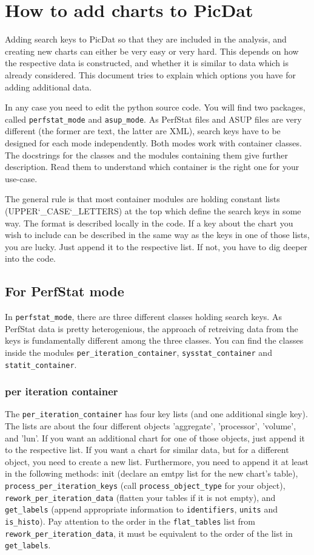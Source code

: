\documentclass[a4paper,11pt]{article}
\begin{document}
\section*{How to add charts to PicDat}

Adding search keys to PicDat so that they are included in the analysis, and creating new charts can either be very easy or very hard. This depends on how the respective data is constructed, and whether it is similar to data which is already considered. This document tries to explain which options you have for adding additional data.
\bigskip

In any case you need to edit the python source code. You will find two packages, called \verb|perfstat_mode| and \verb|asup_mode|. As PerfStat files and ASUP files are very different (the former are text, the latter are XML), search keys have to be designed for each mode independently. Both modes work with container classes. The docstrings for the classes and the modules containing them give further description. Read them to understand which container is the right one for your use-case.
\bigskip

The general rule is that most container modules are holding constant lists (UPPER\char`_CASE\char`_\break LETTERS) at the top which define the search keys in some way. The format is described locally in the code. If a key about the chart you wish to include can be described in the same way as the keys in one of those lists, you are lucky. Just append it to the respective list. If not, you have to dig deeper into the code.

\subsection*{For PerfStat mode}
In \verb|perfstat_mode|, there are three different classes holding search keys. As PerfStat data is pretty heterogenious, the approach of retreiving data from the keys is fundamentally different among the three classes. You can find the classes inside the modules \verb|per_iteration_container|, \verb|sysstat_container| and \verb|statit_container|.

\subsubsection*{per iteration container}
The \verb|per_iteration_container| has four key lists (and one additional single key). The lists are about the four different objects 'aggregate', 'processor', 'volume', and 'lun'. If you want an additional chart for one of those objects, just append it to the respective list. If you want a chart for similar data, but for a different object, you need to create a new list. Furthermore, you need to append it at least in the following methods: init (declare an emtpy list for the new chart's table), \verb|process_per_iteration_keys| (call \verb|process_object_type| for your object), \verb|rework_per_iteration_data| (flatten your tables if it is not empty), and \verb|get_labels| (append appropriate information to \verb|identifiers|, \verb|units| and \verb|is_histo|). Pay attention to the order in the \verb|flat_tables| list from \verb|rework_per_iteration_data|, it must be equivalent to the order of the list in \verb|get_labels|.
\end{document}
